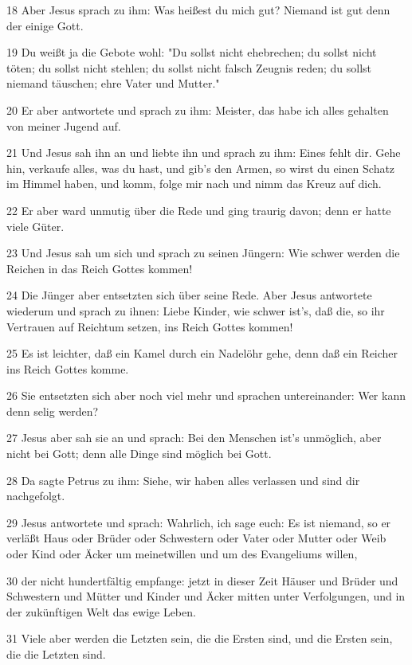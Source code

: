 \par 18 Aber Jesus sprach zu ihm: Was heißest du mich gut? Niemand ist gut denn der einige Gott.
\par 19 Du weißt ja die Gebote wohl: "Du sollst nicht ehebrechen; du sollst nicht töten; du sollst nicht stehlen; du sollst nicht falsch Zeugnis reden; du sollst niemand täuschen; ehre Vater und Mutter."
\par 20 Er aber antwortete und sprach zu ihm: Meister, das habe ich alles gehalten von meiner Jugend auf.
\par 21 Und Jesus sah ihn an und liebte ihn und sprach zu ihm: Eines fehlt dir. Gehe hin, verkaufe alles, was du hast, und gib's den Armen, so wirst du einen Schatz im Himmel haben, und komm, folge mir nach und nimm das Kreuz auf dich.
\par 22 Er aber ward unmutig über die Rede und ging traurig davon; denn er hatte viele Güter.
\par 23 Und Jesus sah um sich und sprach zu seinen Jüngern: Wie schwer werden die Reichen in das Reich Gottes kommen!
\par 24 Die Jünger aber entsetzten sich über seine Rede. Aber Jesus antwortete wiederum und sprach zu ihnen: Liebe Kinder, wie schwer ist's, daß die, so ihr Vertrauen auf Reichtum setzen, ins Reich Gottes kommen!
\par 25 Es ist leichter, daß ein Kamel durch ein Nadelöhr gehe, denn daß ein Reicher ins Reich Gottes komme.
\par 26 Sie entsetzten sich aber noch viel mehr und sprachen untereinander: Wer kann denn selig werden?
\par 27 Jesus aber sah sie an und sprach: Bei den Menschen ist's unmöglich, aber nicht bei Gott; denn alle Dinge sind möglich bei Gott.
\par 28 Da sagte Petrus zu ihm: Siehe, wir haben alles verlassen und sind dir nachgefolgt.
\par 29 Jesus antwortete und sprach: Wahrlich, ich sage euch: Es ist niemand, so er verläßt Haus oder Brüder oder Schwestern oder Vater oder Mutter oder Weib oder Kind oder Äcker um meinetwillen und um des Evangeliums willen,
\par 30 der nicht hundertfältig empfange: jetzt in dieser Zeit Häuser und Brüder und Schwestern und Mütter und Kinder und Äcker mitten unter Verfolgungen, und in der zukünftigen Welt das ewige Leben.
\par 31 Viele aber werden die Letzten sein, die die Ersten sind, und die Ersten sein, die die Letzten sind.
